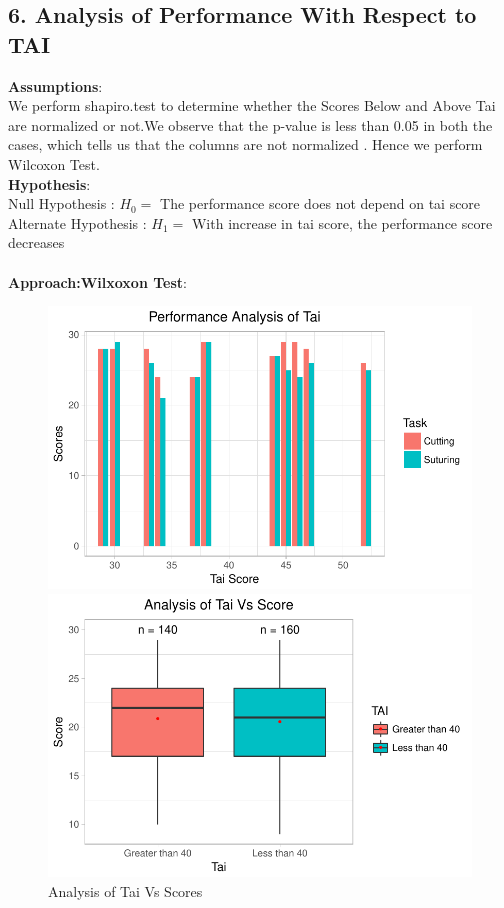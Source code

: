 \documentclass[12pt,epsf]{report}
\begin{document}
{\subsection*{6. Analysis of Performance With Respect to  TAI}
\textbf{Assumptions}:\\
We perform shapiro.test to determine whether the Scores Below and Above Tai  are normalized or not.We observe that the p-value is less than 0.05 in both the cases, which tells us that the columns are not normalized . Hence we perform Wilcoxon Test.\\
\textbf{Hypothesis}:\\
Null Hypothesis : $H_0 = $ The performance score does not depend on tai score\\
Alternate Hypothesis : $H_1 = $ With increase in tai score, the performance score decreases\\
\\
\textbf{Approach:Wilxoxon Test}:
\begin{figure}[!htb]
	\begin{minipage}[c]{0.5\linewidth}
	\includegraphics[width=\linewidth]{TaiVsScores.pdf}
	\caption{ Analysis of Tai Vs Scores}
	\end{minipage}
	\hfill
	\begin{minipage}[c]{0.5\linewidth}
	\includegraphics[width=\linewidth]{TaiVsScores_Box.pdf}

\end{minipage}
\end{figure}}
\end{document}
